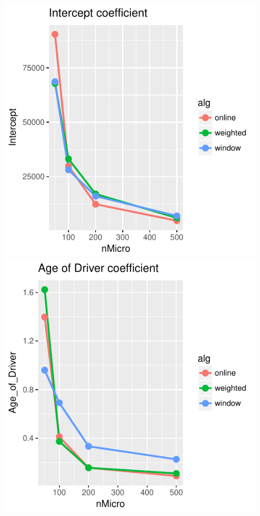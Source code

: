 \includegraphics{offline_regression_files/figure-latex/unnamed-chunk-7-1.pdf}
\includegraphics{offline_regression_files/figure-latex/unnamed-chunk-7-2.pdf}
